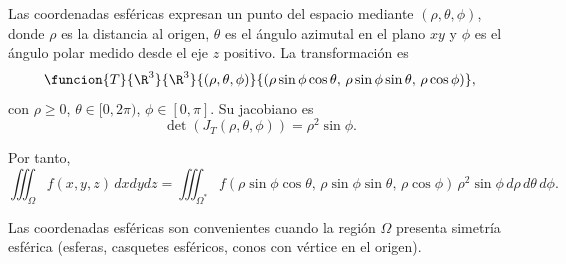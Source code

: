 \documentclass[a4,11pt]{aleph-notas}
\begin{document}
Las coordenadas esféricas expresan un punto del espacio mediante $(\rho,\theta,\phi)$, donde $\rho$ es la distancia al origen, $\theta$ es el ángulo azimutal en el plano $xy$ y $\phi$ es el ángulo polar medido desde el eje $z$ positivo. La transformación es
\[
    \funcion{T}{\R^3}{\R^3}{(\rho,\theta,\phi)}{(\rho\sin\phi\cos\theta,\, \rho\sin\phi\sin\theta,\, \rho\cos\phi)},
\]
con $\rho\geq 0$, $\theta\in[0,2\pi)$, $\phi\in[0,\pi]$. Su jacobiano es
\[
    \det(J_T(\rho,\theta,\phi)) = \rho^2\sin\phi.
\]

Por tanto,
\[
    \iiint_\Omega f(x,y,z)\, dxdydz = \iiint_{\Omega^*} f(\rho\sin\phi\cos\theta,\, \rho\sin\phi\sin\theta,\, \rho\cos\phi)\, \rho^2\sin\phi\, d\rho\, d\theta\, d\phi.
\]

\begin{advertencia}
    Las coordenadas esféricas son convenientes cuando la región $\Omega$ presenta simetría esférica (esferas, casquetes esféricos, conos con vértice en el origen).
\end{advertencia}
\end{document}
